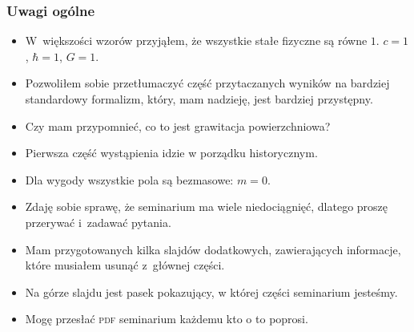 \documentclass[10pt,t]{beamer}
\begin{document}
\begin{frame}
  \frametitle{Uwagi ogólne}


  \begin{itemize}
    \RaggedRight

  \item W~większości wzorów przyjąłem, że wszystkie stałe fizyczne są
    równe $1$. $c = 1$, $\hbar = 1$, $G = 1$.

  \item Pozwoliłem sobie przetłumaczyć część przytaczanych wyników na
    bardziej standardowy formalizm, który, mam nadzieję, jest bardziej
    przystępny.

  \item Czy mam przypomnieć, co to jest grawitacja powierzchniowa?

  \item Pierwsza część wystąpienia idzie w porządku historycznym.

  \item Dla wygody wszystkie pola są bezmasowe: $m = 0$.

  \item Zdaję sobie sprawę, że seminarium ma wiele niedociągnięć,
    dlatego proszę przerywać i~zadawać pytania.

  \item Mam przygotowanych kilka slajdów dodatkowych, zawierających
    informacje, które musiałem usunąć z~głównej części.

  \item Na górze slajdu jest pasek pokazujący, w której części
    seminarium jesteśmy.

  \item Mogę przesłać \textsc{pdf} seminarium każdemu kto o to
    poprosi.

  \end{itemize}

\end{frame}
\end{document}
